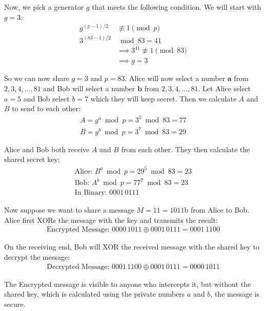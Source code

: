 \documentclass{article}
\begin{document}
Now, we pick a generator $g$ that meets the following condition. We will start with $g = 3$:
\begin{align*}
    g^{(p-1)/2} &\not\equiv 1 \pmod{p} \\
    3^{(83-1)/2} &\bmod 83 = 41 \\
    &\implies 3^{41} \not\equiv 1 \pmod{83} \\
    &\implies g = 3
\end{align*}

So we can now share $g = 3$ and $p = 83$. Alice will now select a number $\textbf{a}$ from $2, 3, 4, \ldots, 81$ and Bob will select a number $\textbf{b}$ from $2, 3, 4, \ldots, 81$. Let Alice select $a = 5$ and Bob select $b = 7$ which they will keep secret. Then we calculate $A$ and $B$ to send to each other:
\begin{align*}
    A = g^a \bmod p = 3^5 \bmod 83 = 77 \\
    B = g^b \bmod p = 3^7 \bmod 83 = 29
\end{align*}


Alice and Bob both receive $A$ and $B$ from each other. They then calculate the shared secret key:
\begin{align*}
    \text{Alice: } B^a \bmod p = 29^5 \bmod 83 = 23 \\
    \text{Bob: } A^b \bmod p = 77^7 \bmod 83 = 23 \\
    \text{In Binary: } 0001 \, 0111
\end{align*}

Now suppose we want to share a message $M = 11 = 1011$b from Alice to Bob. Alice first XORs the message with the key and transmits the result:
\begin{align*}
    \text{Encrypted Message: } 0000 \, 1011 \oplus 0001 \, 0111 = 0001 \, 1100
\end{align*}

On the receiving end, Bob will XOR the received message with the shared key to decrypt the message:
\begin{align*}
    \text{Decrypted Message: } 0001 \, 1100 \oplus 0001 \, 0111 = 0000 \, 1011
\end{align*}

The Encrypted message is visible to anyone who intercepts it, but without the shared key, which is calculated using the private numbers $a$ and $b$, the message is secure.

\end{document}
